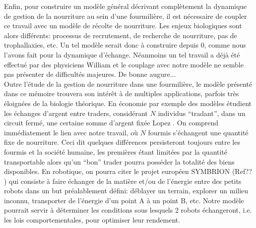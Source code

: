 Enfin, pour construire un modèle général décrivant complètement la dynamique de gestion de la nourriture au sein d'une fourmilière, il est nécessaire de coupler ce travail avec un modèle de récolte de nourriture. Les enjeux biologiques sont alors différents: processus de recrutement, de recherche de nourriture, pas de trophallaxies, etc. Un tel modèle serait donc à construire depuis 0, comme nous l'avons fait pour la dynamique d'échange. Néanmoins un tel travail a déjà été effectué par des physiciens \citep{} William \fixme et le couplage avec notre modèle ne semble pas présenter de difficultés majeures. De bonne augure...\\


Outre l'étude de la gestion de nourriture dans une fourmilière, le modèle présenté dans ce mémoire trouvera son intérêt à de multiples applications, parfois très éloignées de la biologie théorique. En économie par exemple des modèles étudient les échanges d'argent entre traders, considérant $N$ individus ``tradant'', dans un circuit fermé, une certaine somme d'argent fixée \citep{} Lopez \fixme. On comprend immédiatement le lien avec notre travail, où $N$ fourmis s'échangent une quantité fixe de nourriture. Ceci dit quelques différences persisteront toujours entre les fourmis et la société humaine, les premières étant limitées par la quantité transportable alors qu'un ``bon'' trader pourra posséder la totalité des biens disponibles. En robotique, on pourra citer le projet européen SYMBRION (Ref?? \fixme) qui consiste à faire échanger de la matière et/ou de l'énergie entre des petits robots dans un but préalablement défini: déblayer un terrain, explorer un milieu inconnu, transporter de l'énergie d'un point A à un point B, etc. Notre modèle pourrait servir à déterminer les conditions sous lesquels 2 robots échangeront, i.e. les lois comportementales, pour optimiser leur rendement.
